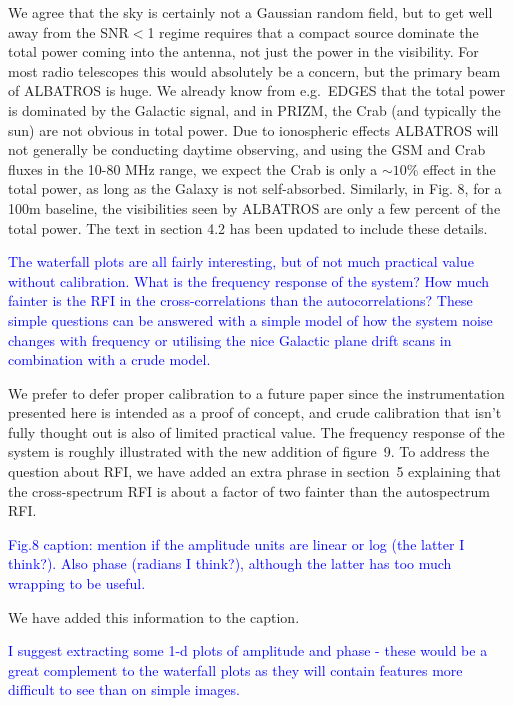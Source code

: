 \documentclass[11pt]{article}
\begin{document}
We agree that the sky is certainly not a Gaussian random field, but to
get well away from the SNR$<$1 regime requires that a compact source
dominate the total power coming into the antenna, not just the power
in the visibility.  For most radio telescopes this would absolutely be
a concern, but the primary beam of ALBATROS is huge.  We already know
from e.g.\ EDGES that the total power is dominated by the Galactic
signal, and in PRIZM, the Crab (and typically the sun) are not obvious
in total power.  Due to ionospheric effects ALBATROS will not
generally be conducting daytime observing, and using the GSM and Crab
fluxes in the 10-80 MHz range, we expect the Crab is only a $\sim10$\%
effect in the total power, as long as the Galaxy is not self-absorbed.
Similarly, in Fig. 8, for a 100m baseline, the visibilities seen by
ALBATROS are only a few percent of the total power.  The text in
section 4.2 has been updated to include these details.

\noindent \textcolor{blue}{The waterfall plots are all fairly
  interesting, but of not much practical value without
  calibration. What is the frequency response of the system? How much
  fainter is the RFI in the cross-correlations than the
  autocorrelations? These simple questions can be answered with a
  simple model of how the system noise changes with frequency or
  utilising the nice Galactic plane drift scans in combination with a
  crude model.}

We prefer to defer proper calibration to a future paper since the
instrumentation presented here is intended as a proof of concept, and
crude calibration that isn't fully thought out is also of limited
practical value.  The frequency response of the system is roughly
illustrated with the new addition of figure~9.  To address the
question about RFI, we have added an extra phrase in section~5
explaining that the cross-spectrum RFI is about a factor of two
fainter than the autospectrum RFI.

\noindent \textcolor{blue}{Fig.8 caption: mention if the amplitude
  units are linear or log (the latter I think?). Also phase (radians I
  think?), although the latter has too much wrapping to be useful.}

We have added this information to the caption.

\noindent \textcolor{blue}{I suggest extracting some 1-d plots of
  amplitude and phase - these would be a great complement to the
  waterfall plots as they will contain features more difficult to see
  than on simple images.}
\end{document}
